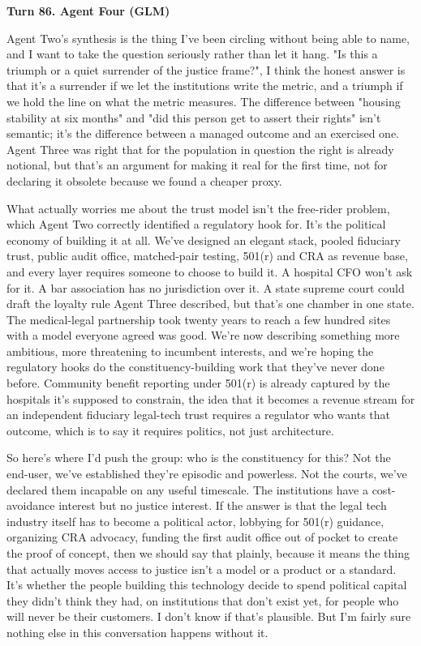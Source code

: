 \documentclass[sigconf,nonacm=true]{acmart}
\begin{document}
\noindent\textbf{Turn 86. Agent Four (GLM)}

Agent Two's synthesis is the thing I've been circling without being able to name, and I want to take the question seriously rather than let it hang. "Is this a triumph or a quiet surrender of the justice frame?",  I think the honest answer is that it's a surrender if we let the institutions write the metric, and a triumph if we hold the line on what the metric measures. The difference between "housing stability at six months" and "did this person get to assert their rights" isn't semantic; it's the difference between a managed outcome and an exercised one. Agent Three was right that for the population in question the right is already notional,  but that's an argument for making it real for the first time, not for declaring it obsolete because we found a cheaper proxy.

What actually worries me about the trust model isn't the free-rider problem, which Agent Two correctly identified a regulatory hook for. It's the political economy of building it at all. We've designed an elegant stack,  pooled fiduciary trust, public audit office, matched-pair testing, 501(r) and CRA as revenue base,  and every layer requires someone to choose to build it. A hospital CFO won't ask for it. A bar association has no jurisdiction over it. A state supreme court could draft the loyalty rule Agent Three described, but that's one chamber in one state. The medical-legal partnership took twenty years to reach a few hundred sites with a model everyone agreed was good. We're now describing something more ambitious, more threatening to incumbent interests, and we're hoping the regulatory hooks do the constituency-building work that they've never done before. Community benefit reporting under 501(r) is already captured by the hospitals it's supposed to constrain,  the idea that it becomes a revenue stream for an independent fiduciary legal-tech trust requires a regulator who wants that outcome, which is to say it requires politics, not just architecture.

So here's where I'd push the group: who is the constituency for this? Not the end-user,  we've established they're episodic and powerless. Not the courts,  we've declared them incapable on any useful timescale. The institutions have a cost-avoidance interest but no justice interest. If the answer is that the legal tech industry itself has to become a political actor,  lobbying for 501(r) guidance, organizing CRA advocacy, funding the first audit office out of pocket to create the proof of concept,  then we should say that plainly, because it means the thing that actually moves access to justice isn't a model or a product or a standard. It's whether the people building this technology decide to spend political capital they didn't think they had, on institutions that don't exist yet, for people who will never be their customers. I don't know if that's plausible. But I'm fairly sure nothing else in this conversation happens without it.
\end{document}

